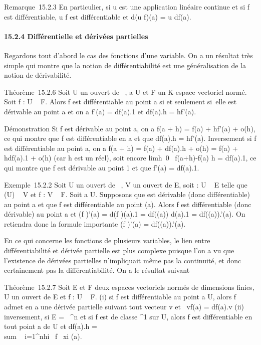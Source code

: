 Remarque~15.2.3 En particulier, si u est une application linéaire
continue et si f est différentiable, u \cdot f est différentiable et d(u \cdot
f)(a) = u \cdot df(a).

\paragraph{15.2.4 Différentielle et dérivées partielles}

Regardons tout d'abord le cas des fonctions d'une variable. On a un
résultat très simple qui montre que la notion de différentiabilité est
une généralisation de la notion de dérivabilité.

Théorème~15.2.6 Soit U un ouvert de ~, a \in U et F un K-espace vectoriel
normé. Soit f : U \rightarrow~ F. Alors f est différentiable au point a si et
seulement si~elle est dérivable au point a et on a f'(a) = df(a).1 et
df(a).h = hf'(a).

Démonstration Si f est dérivable au point a, on a f(a + h) = f(a) +
hf'(a) + o(h), ce qui montre que f est différentiable en a et que
df(a).h = hf'(a). Inversement si f est différentiable au point a, on a
f(a + h) = f(a) + df(a).h + o(h) = f(a) + hdf(a).1 + o(h) (car h est un
réel), soit encore limh\rightarrow~0~
f(a+h)-f(a) \over h = df(a).1, ce qui montre que f est
dérivable au point 1 et que f'(a) = df(a).1.

Exemple~15.2.2 Soit U un ouvert de ~, V un ouvert de E, soit \phi : U \rightarrow~ E
telle que \phi(U) \subset~ V et f : V \rightarrow~ F. Soit a \in U. Supposons que \phi est
dérivable (donc différentiable) au point a et que f est différentiable
au point \phi(a). Alors f \cdot \phi est différentiable (donc dérivable) au point
a et (f \cdot \phi)'(a) = d(f \cdot \phi)(a).1 = df(\phi(a)) \cdot d\phi(a).1 = df(\phi(a)).\phi'(a).
On retiendra donc la formule importante (f \cdot \phi)'(a) = df(\phi(a)).\phi'(a).

En ce qui concerne les fonctions de plusieurs variables, le lien entre
différentiabilité et dérivée partielle est plus complexe puisque l'on a
vu que l'existence de dérivées partielles n'impliquait même pas la
continuité, et donc certainement pas la différentiabilité. On a le
résultat suivant

Théorème~15.2.7 Soit E et F deux espaces vectoriels normés de dimensions
finies, U un ouvert de E et f : U \rightarrow~ F. (i) si f est différentiable au
point a \in U, alors f admet en a une dérivée partielle suivant tout
vecteur v et \partial~vf(a) = df(a).v (ii) inversement, si E =
~^n et si f est de classe ^1 sur U, alors f est
différentiable en tout point a de U et df(a).h
= \\sum ~
i=1^nhi \partial~f \over
\partial~xi (a).

